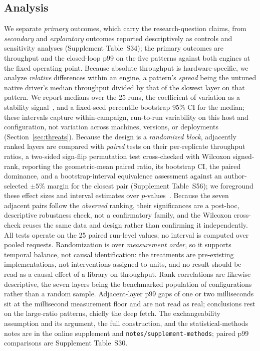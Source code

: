 \subsection{Analysis}
We separate \emph{primary} outcomes, which carry the research-question claims, from \emph{secondary} and \emph{exploratory} outcomes reported descriptively as controls and sensitivity analyses (Supplement Table~S34); the primary outcomes are throughput and the closed-loop p99 on the five patterns against both engines at the fixed operating point.
Because absolute throughput is hardware-specific, we analyze \emph{relative} differences within an engine, a pattern's \emph{spread} being the untuned native driver's median throughput divided by that of the slowest layer on that pattern.
We report medians over the 25 runs, the coefficient of variation as a stability signal~\cite{georges2007rigorous,laaber2019microbenchmarking}, and a fixed-seed percentile bootstrap 95\% CI for the median; these intervals capture within-campaign, run-to-run variability on this host and configuration, not variation across machines, versions, or deployments (Section~\ref{sec:threats}).
Because the design is a \emph{randomized block}, adjacently ranked layers are compared with \emph{paired} tests on their per-replicate throughput ratios, a two-sided sign-flip permutation test cross-checked with Wilcoxon signed-rank, reporting the geometric-mean paired ratio, its bootstrap CI, the paired dominance, and a bootstrap-interval equivalence assessment against an author-selected $\pm5\%$ margin for the closest pair (Supplement Table~S56); we foreground these effect sizes and interval estimates over $p$-values~\cite{arcuri2014hitchhiker,cliff1993dominance}.
Because the seven adjacent pairs follow the \emph{observed} ranking, their significances are a post-hoc, descriptive robustness check, not a confirmatory family, and the Wilcoxon cross-check reuses the same data and design rather than confirming it independently.
All tests operate on the 25 paired run-level values; no interval is computed over pooled requests.
Randomization is over \emph{measurement order}, so it supports temporal balance, not causal identification: the treatments are pre-existing implementations, not interventions assigned to units, and no result should be read as a causal effect of a library on throughput.
Rank correlations are likewise descriptive, the seven layers being the benchmarked population of configurations rather than a random sample.
Adjacent-layer p99 gaps of one or two milliseconds sit at the millisecond measurement floor and are not read as real; conclusions rest on the large-ratio patterns, chiefly the deep fetch.
The exchangeability assumption and its argument, the full construction, and the statistical-methods notes are in the online supplement and \texttt{notes/supplement-methods}; paired p99 comparisons are Supplement Table~S30.

